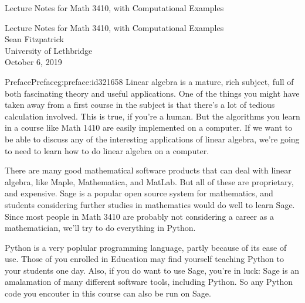 \documentclass[oneside,10pt,]{book}
\numberwithin{equation}{section}
\begin{document}
\frontmatter
\thispagestyle{empty}
{\centering
\vspace*{0.28\textheight}
{\Huge Lecture Notes for Math 3410, with Computational Examples}\\}
\clearpage
\thispagestyle{empty}
\null%
\clearpage
\thispagestyle{empty}
{\centering
\vspace*{0.14\textheight}
{\Huge Lecture Notes for Math 3410, with Computational Examples}\\[3\baselineskip]
{\Large Sean Fitzpatrick}\\[0.5\baselineskip]
{\Large University of Lethbridge}\\[3\baselineskip]
{\Large October 6, 2019}\\}
\clearpage
\thispagestyle{empty}
\null\clearpage
%
%
\typeout{************************************************}
\typeout{************************************************}
%
\begin{preface}{Preface}{}{Preface}{}{}{g:preface:id321658}
Linear algebra is a mature, rich subject, full of both fascinating theory and useful applications. One of the things you might have taken away from a first course in the subject is that there's a lot of tedious calculation involved. This is true, if you're a human. But the algorithms you learn in a course like Math 1410 are easily implemented on a computer. If we want to be able to discuss any of the interesting applications of linear algebra, we're going to need to learn how to do linear algebra on a computer.%
\par
There are many good mathematical software products that can deal with linear algebra, like Maple, Mathematica, and MatLab. But all of these are proprietary, and expensive. Sage is a popular open source system for mathematics, and students considering further studies in mathematics would do well to learn Sage. Since most people in Math 3410 are probably not considering a career as a mathematician, we'll try to do everything in Python.%
\par
Python is a very poplular programming language, partly because of its ease of use. Those of you enrolled in Education may find yourself teaching Python to your students one day. Also, if you do want to use Sage, you're in luck: Sage is an amalamation of many different software tools, including Python. So any Python code you encouter in this course can also be run on Sage.%
\end{preface}
\end{document}
